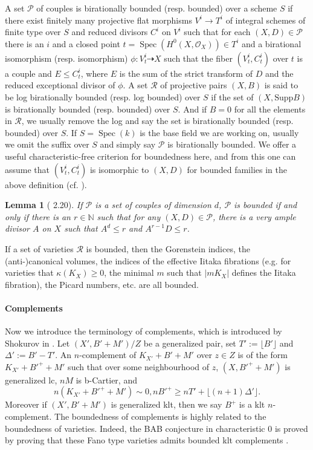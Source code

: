 \documentclass[letterpaper,reqno,12pt]{amsart}
\DeclareMathOperator{\Spec}{Spec}
\newcommand{\tbf}{\textbf}
\numberwithin{equation}{section}
\theoremstyle{plain}
\newtheorem{lemma}[theorem]{Lemma}
\begin{document}
A set $\mathcal P$ of couples is birationally bounded (resp. bounded) over a scheme $S$ if there exist finitely many projective flat morphisms $V^i\to T^i$ of integral schemes of finite type over $S$ and reduced divisors $C^i$ on $V^i$ such that for each $(X,D)\in\mathcal P$ there is an $i$ and a closed point $t=\Spec(H^0(X,\mathcal O_X))\in T^i$ and a birational isomorphism (resp. isomorphism) $\phi:V_t^i\dashrightarrow X$ such that the fiber $(V_t^i,C_t^i)$ over $t$ is a couple and $E\leq C_t^i$, where $E$ is the sum of the strict transform of $D$ and the reduced exceptional divisor of $\phi$. A set $\mathcal R$ of projective pairs $(X,B)$ is said to be log birationally bounded (resp. log bounded) over $S$ if the set of $(X,\text{Supp}B)$ is birationally bounded (resp. bounded) over $S$. And if $B=0$ for all the elements in $\mathcal R$, we usually remove the log and say the set is birationally bounded (resp. bounded) over $S$. If $S=\Spec(k)$ is the base field we are working on, usually we omit the suffix over $S$ and simply say $\mathcal P$ is birationally bounded. We offer a useful characteristic-free criterion for boundedness here, and from this one can assume that $(V_t^i,C_t^i)$ is isomorphic to $(X,D)$ for bounded families in the above definition (cf. \cite[2.21]{birkar2019antipluricanonicalsystemsfanovarieties}).
\begin{lemma}[\cite{birkar2019antipluricanonicalsystemsfanovarieties} 2.20]
    If $\mathcal P$ is a set of couples of dimension $d$, $\mathcal P$ is bounded if and only if there is an $r\in \mathbb N$ such that for any $(X,D)\in \mathcal P$, there is a very ample divisor $A$ on $X$ such that $A^d\leq r$ and $A^{r-1}D\leq r$.
\end{lemma}
If a set of varieties $\mathcal R$ is bounded, then the Gorenstein indices, the (anti-)canonical volumes, the indices of the effective Iitaka fibrations (e.g. for varieties that $\kappa(K_X)\geq 0$, the minimal $m$ such that $|mK_X|$ defines the Iitaka fibration), the Picard numbers, etc. are all bounded.

\paragraph{\tbf{Complements}}

Now we introduce the terminology of complements, which is introduced by Shokurov in \cite{3foldflip}. Let $(X',B'+M')/Z$ be a generalized pair, set $T':=\lfloor B'\rfloor$ and $\Delta':=B'-T'$. An $n$-complement of $K_{X'}+B'+M'$ over $z\in Z$ is of the form $K_{X'}+B'^++M'$ such that over some neighbourhood of $z$, $(X,B'^++M')$ is generalized lc, $nM$ is b-Cartier, and \[n(K_{X'}+B'^++M')\sim 0,nB'^+\geq nT'+\lfloor (n+1)\Delta'\rfloor.\] Moreover if $(X',B'+M')$ is generalized klt, then we say $B^+$ is a klt $n$-complement. The boundedness of complements is highly related to the boundedness of varieties. Indeed, the BAB conjecture in characteristic $0$ is proved by proving that these Fano type varieties admits bounded klt complements \cite{birkar2020singularitieslinearsystemsboundedness}.
\end{document}
